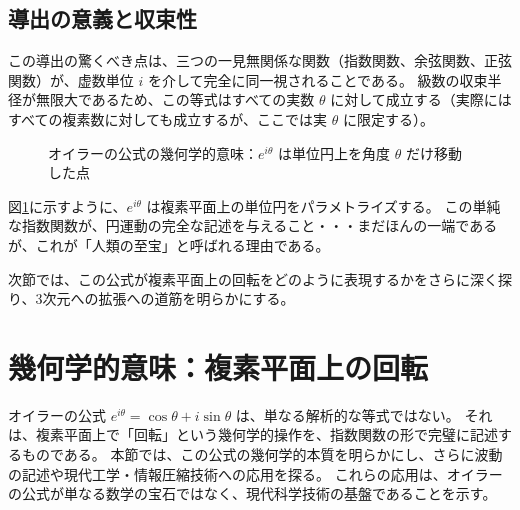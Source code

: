 \documentclass[dvipdfmx,a4paper]{jsbook}
\theoremstyle{definition}
\theoremstyle{remark}
\begin{document}
\subsection{導出の意義と収束性}

この導出の驚くべき点は、三つの一見無関係な関数（指数関数、余弦関数、正弦関数）が、虚数単位 $i$ を介して完全に同一視されることである。
級数の収束半径が無限大であるため、この等式はすべての実数 $\theta$ に対して成立する（実際にはすべての複素数に対しても成立するが、ここでは実 $\theta$ に限定する）。

\begin{figure}[htbp]
\centering
{}
\caption{オイラーの公式の幾何学的意味：$e^{i\theta}$ は単位円上を角度 $\theta$ だけ移動した点}
\label{fig:euler-circle}
\end{figure}

図\ref{fig:euler-circle}に示すように、$e^{i\theta}$ は複素平面上の単位円をパラメトライズする。
この単純な指数関数が、円運動の完全な記述を与えること・・・まだほんの一端であるが、これが「人類の至宝」と呼ばれる理由である。

次節では、この公式が複素平面上の回転をどのように表現するかをさらに深く探り、3次元への拡張への道筋を明らかにする。

\section{幾何学的意味：複素平面上の回転}
\label{sec:geometric-rotation}

オイラーの公式 $e^{i\theta} = \cos\theta + i\sin\theta$ は、単なる解析的な等式ではない。
それは、複素平面上で「回転」という幾何学的操作を、指数関数の形で完璧に記述するものである。
本節では、この公式の幾何学的本質を明らかにし、さらに波動の記述や現代工学・情報圧縮技術への応用を探る。
これらの応用は、オイラーの公式が単なる数学の宝石ではなく、現代科学技術の基盤であることを示す。
\end{document}
